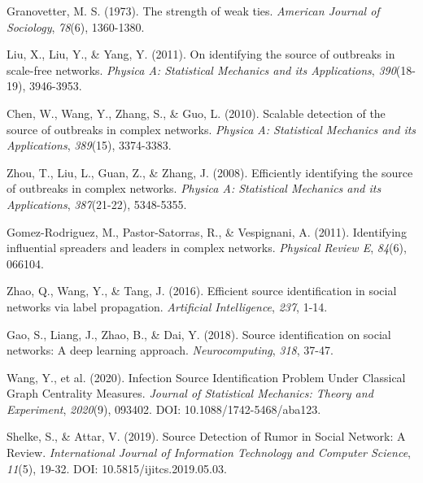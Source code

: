 \begin{thebibliography}{99}
\thispagestyle{empty} %

Granovetter, M. S. (1973). The strength of weak ties. \textit{American Journal of Sociology}, \textit{78}(6), 1360-1380.

Liu, X., Liu, Y., \& Yang, Y. (2011). On identifying the source of outbreaks in scale-free networks. \textit{Physica A: Statistical Mechanics and its Applications}, \textit{390}(18-19), 3946-3953.

Chen, W., Wang, Y., Zhang, S., \& Guo, L. (2010). Scalable detection of the source of outbreaks in complex networks. \textit{Physica A: Statistical Mechanics and its Applications}, \textit{389}(15), 3374-3383.

Zhou, T., Liu, L., Guan, Z., \& Zhang, J. (2008). Efficiently identifying the source of outbreaks in complex networks. \textit{Physica A: Statistical Mechanics and its Applications}, \textit{387}(21-22), 5348-5355.

Gomez-Rodriguez, M., Pastor-Satorras, R., \& Vespignani, A. (2011). Identifying influential spreaders and leaders in complex networks. \textit{Physical Review E}, \textit{84}(6), 066104.

Zhao, Q., Wang, Y., \& Tang, J. (2016). Efficient source identification in social networks via label propagation. \textit{Artificial Intelligence}, \textit{237}, 1-14.

Gao, S., Liang, J., Zhao, B., \& Dai, Y. (2018). Source identification on social networks: A deep learning approach. \textit{Neurocomputing}, \textit{318}, 37-47.

Wang, Y., et al. (2020). Infection Source Identification Problem Under Classical Graph Centrality Measures. \textit{Journal of Statistical Mechanics: Theory and Experiment}, \textit{2020}(9), 093402. DOI: 10.1088/1742-5468/aba123.

Shelke, S., \& Attar, V. (2019). Source Detection of Rumor in Social Network: A Review. \textit{International Journal of Information Technology and Computer Science}, \textit{11}(5), 19-32. DOI: 10.5815/ijitcs.2019.05.03.


\end{thebibliography}
